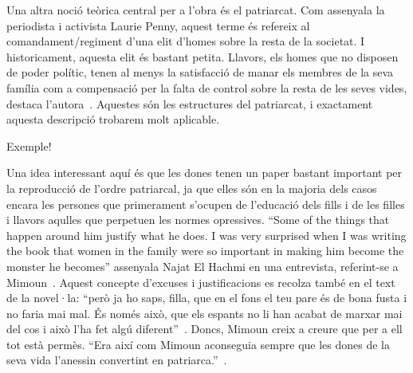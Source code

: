 Una altra noció teòrica central per a l'obra és el patriarcat.
Com assenyala la periodista i activista Laurie Penny, aquest terme és refereix al comandament/regiment d'una elit d'homes sobre la resta de la societat.
I historicament, aquesta elit és bastant petita.
Llavors, els homes que no disposen de poder polític, tenen al menys la satisfacció de manar els membres de la seva família com a compensació per la falta de control sobre la resta de les seves vides, destaca l'autora~\autocite[69-70]{Penny2014}.
Aquestes són les estructures del patriarcat, i exactament aquesta descripció trobarem molt aplicable.

Exemple!

Una idea interessant aquí és que les dones tenen un paper bastant important per la reproducció de l'ordre patriarcal, ja que elles són en la majoria dels casos encara les persones que primerament s'ocupen de l'educació dels fills i de les filles i llavors aqulles que perpetuen les normes opressives.
``Some of the things that happen around him justify what he does. I was very surprised when I was writing the book that women in the family were so important in making him become the monster he becomes'' assenyala Najat El Hachmi en una entrevista, referint-se a Mimoun~\autocite{HaAM2011}.
Aquest concepte d'excuses i justificacions es recolza també en el text de la novel·la: ``però ja ho saps, filla, que en el fons el teu pare és de bona fusta i no faria mai mal. És només això, que els espants no li han acabat de marxar mai del cos i això l'ha fet algú diferent''~\autocite[18]{ElHachmi2008}.
Doncs, Mimoun creix a creure que per a ell tot està permès.
``Era així com Mimoun aconseguia sempre que les dones de la seva vida l'anessin convertint en patriarca.''~\autocite[99]{ElHachmi2008}.


